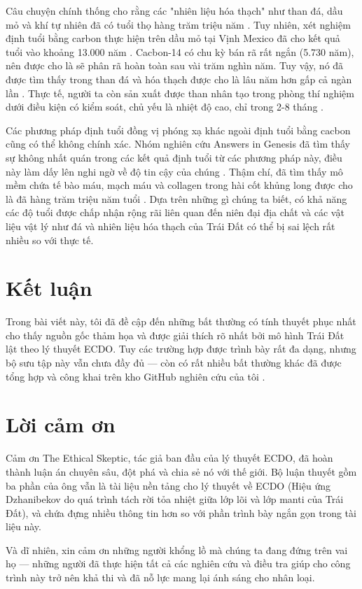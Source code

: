 \documentclass[10pt,twocolumn,letterpaper]{article}
\begin{document}
Câu chuyện chính thống cho rằng các "nhiên liệu hóa thạch" như than đá, dầu mỏ và khí tự nhiên đã có tuổi thọ hàng trăm triệu năm \cite{104}. Tuy nhiên, xét nghiệm định tuổi bằng carbon thực hiện trên dầu mỏ tại Vịnh Mexico đã cho kết quả tuổi vào khoảng 13.000 năm \cite{105}. Cacbon-14 có chu kỳ bán rã rất ngắn (5.730 năm), nên được cho là sẽ phân rã hoàn toàn sau vài trăm nghìn năm. Tuy vậy, nó đã được tìm thấy trong than đá và hóa thạch được cho là lâu năm hơn gấp cả ngàn lần \cite{106}. Thực tế, người ta còn sản xuất được than nhân tạo trong phòng thí nghiệm dưới điều kiện có kiểm soát, chủ yếu là nhiệt độ cao, chỉ trong 2-8 tháng \cite{107}.

Các phương pháp định tuổi đồng vị phóng xạ khác ngoài định tuổi bằng cacbon cũng có thể không chính xác. Nhóm nghiên cứu Answers in Genesis đã tìm thấy sự không nhất quán trong các kết quả định tuổi từ các phương pháp này, điều này làm dấy lên nghi ngờ về độ tin cậy của chúng \cite{108}. Thậm chí, đã tìm thấy mô mềm chứa tế bào máu, mạch máu và collagen trong hài cốt khủng long được cho là đã hàng trăm triệu năm tuổi \cite{109,110}. Dựa trên những gì chúng ta biết, có khả năng các độ tuổi được chấp nhận rộng rãi liên quan đến niên đại địa chất và các vật liệu vật lý như đá và nhiên liệu hóa thạch của Trái Đất có thể bị sai lệch rất nhiều so với thực tế.

\section{Kết luận}

Trong bài viết này, tôi đã đề cập đến những bất thường có tính thuyết phục nhất cho thấy nguồn gốc thảm họa và được giải thích rõ nhất bởi mô hình Trái Đất lật theo lý thuyết ECDO. Tuy các trường hợp được trình bày rất đa dạng, nhưng bộ sưu tập này vẫn chưa đầy đủ — còn có rất nhiều bất thường khác đã được tổng hợp và công khai trên kho GitHub nghiên cứu của tôi \cite{2}.

\section{Lời cảm ơn}

Cảm ơn The Ethical Skeptic, tác giả ban đầu của lý thuyết ECDO, đã hoàn thành luận án chuyên sâu, đột phá và chia sẻ nó với thế giới. Bộ luận thuyết gồm ba phần của ông \cite{1} vẫn là tài liệu nền tảng cho lý thuyết về ECDO (Hiệu ứng Dzhanibekov do quá trình tách rời tỏa nhiệt giữa lớp lõi và lớp manti của Trái Đất), và chứa đựng nhiều thông tin hơn so với phần trình bày ngắn gọn trong tài liệu này.

Và dĩ nhiên, xin cảm ơn những người khổng lồ mà chúng ta đang đứng trên vai họ — những người đã thực hiện tất cả các nghiên cứu và điều tra giúp cho công trình này trở nên khả thi và đã nỗ lực mang lại ánh sáng cho nhân loại.
\clearpage
\twocolumn

{\small
\renewcommand{\refname}{Tài liệu tham khảo}


}
\end{document}
